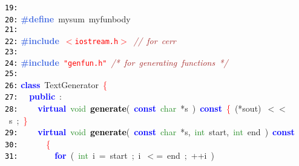 \documentclass{article}
\begin{document}
\mbox{}\texttt{\textcolor{Black}{19:}}  \\
\mbox{}\texttt{\textcolor{Black}{20:}} \textbf{\textcolor{RoyalBlue}{\#define}}\ \label{test.h:20}mysum\ myfunbody\  \\
\mbox{}\texttt{\textcolor{Black}{21:}}  \\
\mbox{}\texttt{\textcolor{Black}{22:}} \textbf{\textcolor{RoyalBlue}{\#include}}\ \texttt{\textcolor{Red}{$<$iostream.h$>$}}\ \textit{\textcolor{Brown}{//\ for\ cerr}} \\
\mbox{}\texttt{\textcolor{Black}{23:}}  \\
\mbox{}\texttt{\textcolor{Black}{24:}} \textbf{\textcolor{RoyalBlue}{\#include}}\ \texttt{\textcolor{Red}{"{}genfun.h"{}}}\ \textit{\textcolor{Brown}{/*\ for\ generating\ functions\ */}} \\
\mbox{}\texttt{\textcolor{Black}{25:}}  \\
\mbox{}\texttt{\textcolor{Black}{26:}} \textbf{\textcolor{Blue}{class}}\ \textcolor{TealBlue}{\label{test.h:26}TextGenerator}\ \textcolor{Red}{\{} \\
\mbox{}\texttt{\textcolor{Black}{27:}} \ \ \textbf{\textcolor{Blue}{public}}\ \textcolor{BrickRed}{:} \\
\mbox{}\texttt{\textcolor{Black}{28:}} \ \ \ \ \textbf{\textcolor{Blue}{virtual}}\ \textcolor{ForestGreen}{void}\ \textbf{\textcolor{Black}{\label{test.h:28}generate}}\textcolor{BrickRed}{(}\ \textbf{\textcolor{Blue}{const}}\ \textcolor{ForestGreen}{char}\ \textcolor{BrickRed}{*}s\ \textcolor{BrickRed}{)}\ \textbf{\textcolor{Blue}{const}}\ \textcolor{Red}{\{}\ \textcolor{BrickRed}{(*}sout\textcolor{BrickRed}{)}\ \textcolor{BrickRed}{$<$$<$}\ s\ \textcolor{BrickRed}{;}\ \textcolor{Red}{\}} \\
\mbox{}\texttt{\textcolor{Black}{29:}} \ \ \ \ \textbf{\textcolor{Blue}{virtual}}\ \textcolor{ForestGreen}{void}\ \textbf{\textcolor{Black}{\label{test.h:29}generate}}\textcolor{BrickRed}{(}\ \textbf{\textcolor{Blue}{const}}\ \textcolor{ForestGreen}{char}\ \textcolor{BrickRed}{*}s\textcolor{BrickRed}{,}\ \textcolor{ForestGreen}{int}\ start\textcolor{BrickRed}{,}\ \textcolor{ForestGreen}{int}\ end\ \textcolor{BrickRed}{)}\ \textbf{\textcolor{Blue}{const}}\  \\
\mbox{}\texttt{\textcolor{Black}{30:}} \ \ \ \ \ \ \textcolor{Red}{\{} \\
\mbox{}\texttt{\textcolor{Black}{31:}} \ \ \ \ \ \ \ \ \textbf{\textcolor{Blue}{for}}\ \textcolor{BrickRed}{(}\ \textcolor{ForestGreen}{int}\ i\ \textcolor{BrickRed}{=}\ start\ \textcolor{BrickRed}{;}\ i\ \textcolor{BrickRed}{$<$=}\ end\ \textcolor{BrickRed}{;}\ \textcolor{BrickRed}{++}i\ \textcolor{BrickRed}{)} \\
\end{document}
